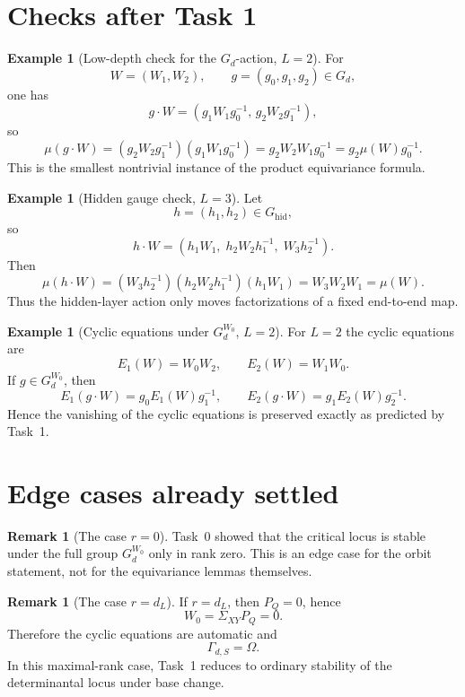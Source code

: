 \documentclass{article}
\theoremstyle{definition}
\newtheorem{remark}[theorem]{Remark}
\newtheorem{example}[theorem]{Example}
\begin{document}
\section{Checks after Task 1}

\begin{example}[Low-depth check for the $G_d$-action, $L=2$]
For
\[
W=(W_1,W_2),
\qquad
g=(g_0,g_1,g_2)\in G_d,
\]
one has
\[
g\cdot W=(g_1W_1g_0^{-1},\, g_2W_2g_1^{-1}),
\]
so
\[
\mu(g\cdot W)
=(g_2W_2g_1^{-1})(g_1W_1g_0^{-1})
=g_2W_2W_1g_0^{-1}
=g_2\mu(W)g_0^{-1}.
\]
This is the smallest nontrivial instance of the product equivariance formula.
\end{example}

\begin{example}[Hidden gauge check, $L=3$]
Let
\[
h=(h_1,h_2)\in G_{\mathrm{hid}},
\]
so
\[
h\cdot W=(h_1W_1,\; h_2W_2h_1^{-1},\; W_3h_2^{-1}).
\]
Then
\[
\mu(h\cdot W)
=(W_3h_2^{-1})(h_2W_2h_1^{-1})(h_1W_1)
=W_3W_2W_1
=\mu(W).
\]
Thus the hidden-layer action only moves factorizations of a fixed end-to-end map.
\end{example}

\begin{example}[Cyclic equations under $G_d^{W_0}$, $L=2$]
For $L=2$ the cyclic equations are
\[
E_1(W)=W_0W_2,
\qquad
E_2(W)=W_1W_0.
\]
If $g\in G_d^{W_0}$, then
\[
E_1(g\cdot W)=g_0E_1(W)g_1^{-1},
\qquad
E_2(g\cdot W)=g_1E_2(W)g_2^{-1}.
\]
Hence the vanishing of the cyclic equations is preserved exactly as predicted by Task~1.
\end{example}

\section{Edge cases already settled}

\begin{remark}[The case $r=0$]
Task~0 showed that the critical locus is stable under the full group $G_d^{W_0}$ only in rank zero. This is an edge case for the orbit statement, not for the equivariance lemmas themselves.
\end{remark}

\begin{remark}[The case $r=d_L$]
If $r=d_L$, then $P_Q=0$, hence
\[
W_0=\Sigma_{XY}P_Q=0.
\]
Therefore the cyclic equations are automatic and
\[
\Gamma_{d,S}=\Omega.
\]
In this maximal-rank case, Task~1 reduces to ordinary stability of the determinantal locus under base change.
\end{remark}
\end{document}
